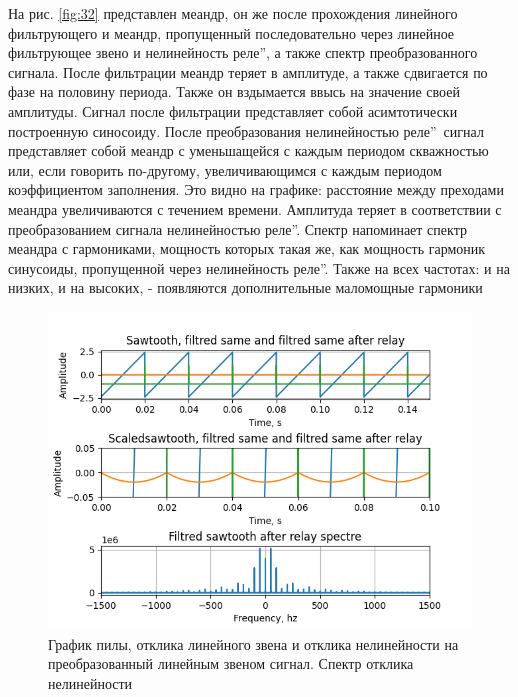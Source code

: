 На рис. \ref{fig:32} представлен меандр, он же после прохождения
линейного фильтрующего и меандр, пропущенный последовательно через линейное
фильтрующее звено и нелинейность  реле\textquotedblright,
а также спектр преобразованного сигнала. После фильтрации меандр теряет в амплитуде,
а также сдвигается по фазе на половину периода. Также он вздымается ввысь на значение
своей амплитуды. Сигнал после фильтрации представляет собой асимтотически построенную
синосоиду. После преобразования нелинейностью  реле\textquotedblright\
сигнал представляет собой меандр с уменьшащейся с каждым периодом скважностью или, если
говорить по-другому, увеличивающимся с каждым периодом коэффициентом заполнения.
Это видно на графике: расстояние между преходами меандра увеличиваются с течением времени. 
Амплитуда теряет в соответствии с преобразованием сигнала нелинейностью
\textquotedblleftИдеальное реле\textquotedblright. Спектр
напоминает спектр меандра с гармониками, мощность которых такая же, как мощность
гармоник синусоиды, пропущенной через нелинейность
 реле\textquotedblright. Также на всех частотах: и на
низких, и на высоких, - появляются дополнительные маломощные гармоники

\begin{figure}[H]
	\centering
	\includegraphics[width=1.05\linewidth]{body/images/filtred-sawtooth-after-relay-and-its-spectre.png}
	\caption{График пилы, отклика линейного звена и отклика нелинейности на преобразованный
	линейным звеном сигнал. Спектр отклика нелинейности}
	\label{fig:33}
\end{figure}

